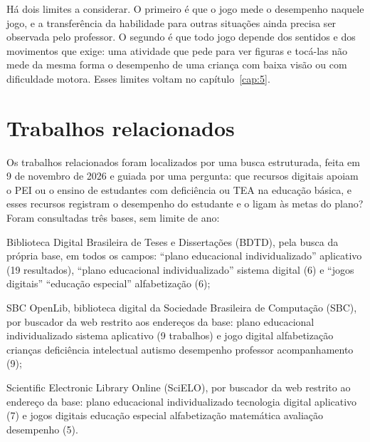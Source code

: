 Há dois limites a considerar. O primeiro é que o jogo mede o desempenho naquele jogo, e a transferência da habilidade para outras situações ainda precisa ser observada pelo professor. O segundo é que todo jogo depende dos sentidos e dos movimentos que exige: uma atividade que pede para ver figuras e tocá-las não mede da mesma forma o desempenho de uma criança com baixa visão ou com dificuldade motora. Esses limites voltam no capítulo~\ref{cap:5}.

\section{Trabalhos relacionados}\label{sec:2.5}

Os trabalhos relacionados foram localizados por uma busca estruturada, feita em 9 de novembro de 2026 e guiada por uma pergunta: que recursos digitais apoiam o PEI ou o ensino de estudantes com deficiência ou TEA na educação básica, e esses recursos registram o desempenho do estudante e o ligam às metas do plano? Foram consultadas três bases, sem limite de ano:

\begin{alineasIFTO}
  \item Biblioteca Digital Brasileira de Teses e Dissertações (BDTD), pela busca da própria base, em todos os campos: “plano educacional individualizado” aplicativo (19 resultados), “plano educacional individualizado” sistema digital (6) e “jogos digitais” “educação especial” alfabetização (6);
  \item SBC OpenLib, biblioteca digital da Sociedade Brasileira de Computação (SBC), por buscador da web restrito aos endereços da base: plano educacional individualizado sistema aplicativo (9 trabalhos) e jogo digital alfabetização crianças deficiência intelectual autismo desempenho professor acompanhamento (9);
  \item Scientific Electronic Library Online (SciELO), por buscador da web restrito ao endereço da base: plano educacional individualizado tecnologia digital aplicativo (7) e jogos digitais educação especial alfabetização matemática avaliação desempenho (5).
\end{alineasIFTO}

